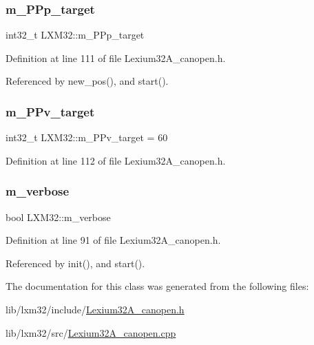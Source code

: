 \subsubsection{\texorpdfstring{m\+\_\+\+P\+Pp\+\_\+target}{m\_PPp\_target}}
{\footnotesize\ttfamily int32\+\_\+t L\+X\+M32\+::m\+\_\+\+P\+Pp\+\_\+target\hspace{0.3cm}{\ttfamily [private]}}



Definition at line 111 of file Lexium32\+A\+\_\+canopen.\+h.



Referenced by new\+\_\+pos(), and start().

\mbox{\label{class_l_x_m32_a849cddf9b1d4f658a8fda818f071c721}} 
\subsubsection{\texorpdfstring{m\+\_\+\+P\+Pv\+\_\+target}{m\_PPv\_target}}
{\footnotesize\ttfamily int32\+\_\+t L\+X\+M32\+::m\+\_\+\+P\+Pv\+\_\+target = 60\hspace{0.3cm}{\ttfamily [private]}}



Definition at line 112 of file Lexium32\+A\+\_\+canopen.\+h.

\mbox{\label{class_l_x_m32_a844f338bcaeb9315011d1775a7334221}} 
\subsubsection{\texorpdfstring{m\+\_\+verbose}{m\_verbose}}
{\footnotesize\ttfamily bool L\+X\+M32\+::m\+\_\+verbose\hspace{0.3cm}{\ttfamily [private]}}



Definition at line 91 of file Lexium32\+A\+\_\+canopen.\+h.



Referenced by init(), and start().



The documentation for this class was generated from the following files\+:\begin{DoxyCompactItemize}
\item 
lib/lxm32/include/\hyperlink{_lexium32_a__canopen_8h}{Lexium32\+A\+\_\+canopen.\+h}\item 
lib/lxm32/src/\hyperlink{_lexium32_a__canopen_8cpp}{Lexium32\+A\+\_\+canopen.\+cpp}\end{DoxyCompactItemize}
